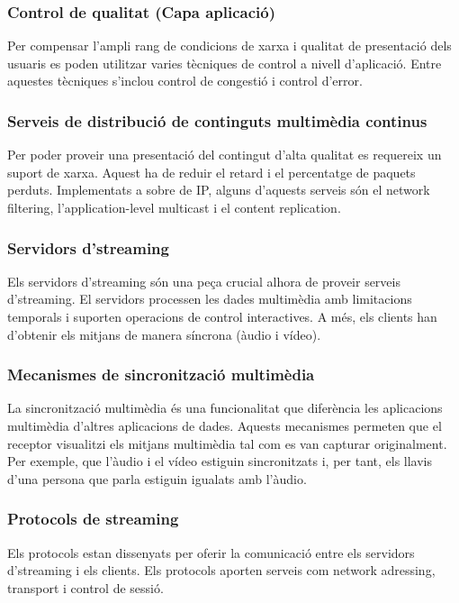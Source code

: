 \documentclass[12pt, titlepage]{article}
\begin{document}
\subsubsection{Control de qualitat (Capa aplicació)}
Per compensar l’ampli rang de condicions de xarxa i qualitat de presentació dels
usuaris es poden utilitzar varies tècniques de control a nivell d’aplicació.
Entre aquestes tècniques s’inclou control de congestió i control d’error.

\subsubsection{Serveis de distribució de continguts multimèdia continus}
Per poder proveir una presentació del contingut d’alta qualitat es requereix un
suport de xarxa. Aquest ha de reduir el retard i el percentatge de paquets perduts.
Implementats a sobre de IP, alguns d’aquests serveis són el network filtering,
l'application-level multicast i el content replication.

\subsubsection{Servidors d’streaming}
Els servidors d’streaming són una peça crucial alhora de proveir serveis
d’streaming. El servidors processen les dades multimèdia amb limitacions
temporals i suporten operacions de control interactives. A més, els clients han
d’obtenir els mitjans de manera síncrona (àudio i vídeo).

\subsubsection{Mecanismes de sincronització multimèdia}
La sincronització multimèdia és una funcionalitat que diferència les aplicacions
multimèdia d’altres aplicacions de dades. Aquests mecanismes permeten que el
receptor visualitzi els mitjans multimèdia tal com es van capturar originalment.
Per exemple, que l’àudio i el vídeo estiguin sincronitzats i, per tant, els llavis
d’una persona que parla estiguin igualats amb l’àudio.

\subsubsection{Protocols de streaming}
Els protocols estan dissenyats per oferir la comunicació entre els servidors
d’streaming i els clients. Els protocols aporten serveis com network adressing,
transport i control de sessió.
\end{document}
